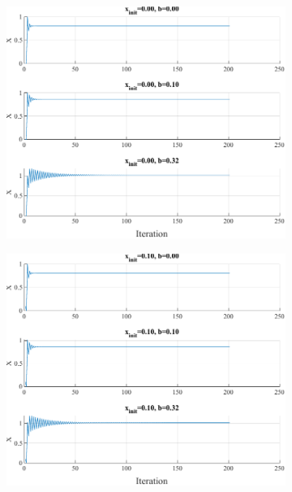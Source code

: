 \begin{figure}[htpb]
	\centering
	\begin{subfigure}{0.47\textwidth}
		\includegraphics[width=\textwidth]{../Problem 3/prob3_(b)_x_init_0.00.pdf}
		\caption{}
	\end{subfigure}
	\begin{subfigure}{0.47\textwidth}
		\includegraphics[width=\textwidth]{../Problem 3/prob3_(b)_x_init_0.10.pdf}
		\caption{}
	\end{subfigure}\\[4mm]

\end{figure}
